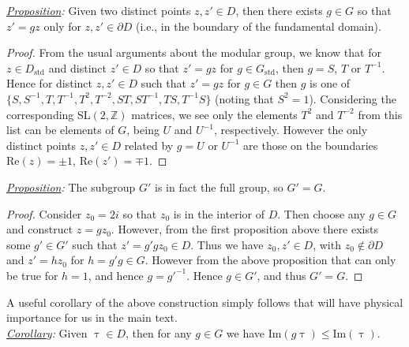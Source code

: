 \noindent \textit{\underline{Proposition}:} Given two distinct points $z, z' \in D$, then there exists $g \in G$ so that $z' = g z$ only for $z, z' \in \partial D$ (i.e., in the boundary of the fundamental domain).

\begin{proof}
  From the usual arguments about the modular group, we know that for $z \in D_{\text{std}}$ and distinct $z' \in D$ so that $z' = g z$ for $g \in G_{\text{std}}$, then $g = S$, $T$ or $T^{-1}$.
  Hence for distinct $z, z' \in D$ such that $z' = g z$ for $g \in G$ then $g$ is one of $\{S, S^{-1}, T, T^{-1}, T^2, T^{-2}, S T, S T^{-1}, T S, T^{-1} S\}$ (noting that $S^2 = 1$).
  Considering the corresponding SL$(2, \mathbb{Z})$ matrices, we see only the elements $T^2$ and $T^{-2}$ from this list can be elements of $G$, being $U$ and $U^{-1}$, respectively.
  However the only distinct points $z, z' \in D$ related by $g = U$ or $U^{-1}$ are those on the boundaries $\mathrm{Re}(z) = \pm 1$, $\mathrm{Re}(z') = \mp 1$.
\end{proof}

\noindent \textit{\underline{Proposition}:} The subgroup $G'$ is in fact the full group, so $G' = G$.

\begin{proof}
  Consider $z_0 = 2i$ so that $z_0$ is in the interior of $D$.
  Then choose any $g \in G$ and construct $z = g z_0$.
  However, from the first proposition above there exists some $g' \in G'$ such that $z' = g' g z_0 \in D$.
  Thus we have $z_0, z' \in D$, with $z_0 \not\in \partial D$ and $z' = h z_0$ for $h = g' g \in G$.
  However from the above proposition that can only be true for $h = 1$, and hence $g = g'^{-1}$.
  Hence $g \in G'$, and thus $G' = G$.
\end{proof}

A useful corollary of the above construction simply follows that will have physical importance for us in the main text. \\

\noindent \textit{\underline{Corollary}:} Given $\uptau \in D$, then for any $g \in G$ we have $\mathrm{Im}(g \uptau) \le \mathrm{Im}(\uptau)$.

